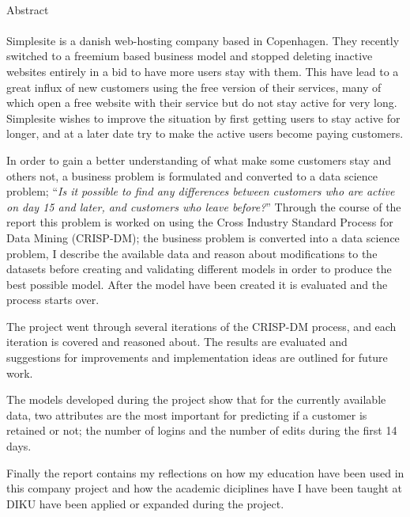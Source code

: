 \hspace{1cm}\\[5cm]
{\huge Abstract}
\\\HRule\\

Simplesite is a danish web-hosting company based in Copenhagen. They recently
switched to a freemium based business model and stopped deleting inactive
websites entirely in a bid to have more users stay with them. This have lead to
a great influx of new customers using the free version of their services, many
of which open a free website with their service but do not stay active for very
long. Simplesite wishes to improve the situation by first getting users to stay
active for longer, and at a later date try to make the active users become
paying customers.

In order to gain a better understanding of what make some customers stay and
others not, a business problem is formulated and converted to a data science
problem; ``\textit{Is it possible to find any differences between customers who
are active on day 15 and later, and customers who leave before?}'' Through the
course of the report this problem is worked on using the Cross Industry Standard
Process for Data Mining (CRISP-DM); the business problem is converted into a
data science problem, I describe the available data and reason about
modifications to the datasets before creating and validating different models in
order to produce the best possible model. After the model have been created it
is evaluated and the process starts over.

The project went through several iterations of the CRISP-DM process, and each
iteration is covered and reasoned about. The results are evaluated and
suggestions for improvements and implementation ideas are outlined for future
work.

The models developed during the project show that for the currently available
data, two attributes are the most important for predicting if a customer is
retained or not; the number of logins and the number of edits during the first
14 days.

Finally the report contains my reflections on how my education have been used in
this company project and how the academic diciplines have I have been taught at
DIKU have been applied or expanded during the project.
